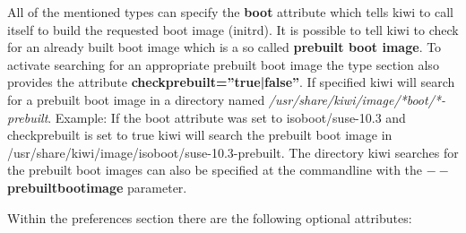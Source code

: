 All of the mentioned types can specify the \textbf{boot} attribute
which tells kiwi to call itself to build the requested boot image (initrd).
It is possible to tell kiwi to check for an already built boot image
which is a so called \textbf{prebuilt boot image}. To activate searching
for an appropriate prebuilt boot image the type section also provides the
attribute \textbf{checkprebuilt=''true|false''}. If specified kiwi will
search for a prebuilt boot image in a directory named
\textit{/usr/share/kiwi/image/*boot/*-prebuilt}. Example: If the boot
attribute was set to isoboot/suse-10.3 and checkprebuilt is set to true
kiwi will search the prebuilt boot image in
/usr/share/kiwi/image/isoboot/suse-10.3-prebuilt. The directory kiwi
searches for the prebuilt boot images can also be specified at the
commandline with the \textbf{$--$prebuiltbootimage} parameter.

Within the preferences section there are the following optional
attributes:

